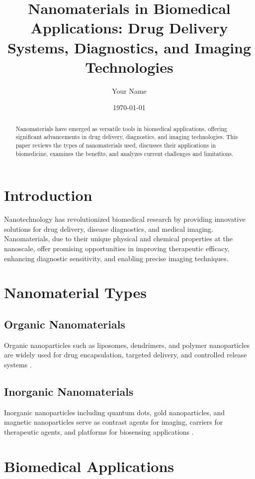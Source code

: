 \documentclass[12pt]{article}
\title{Nanomaterials in Biomedical Applications: Drug Delivery Systems, Diagnostics, and Imaging Technologies}
\author{Your Name}
\date{\today}
\begin{document}
\maketitle

\begin{abstract}
Nanomaterials have emerged as versatile tools in biomedical applications, offering significant advancements in drug delivery, diagnostics, and imaging technologies. This paper reviews the types of nanomaterials used, discusses their applications in biomedicine, examines the benefits, and analyzes current challenges and limitations.
\end{abstract}

\section{Introduction}
Nanotechnology has revolutionized biomedical research by providing innovative solutions for drug delivery, disease diagnostics, and medical imaging. Nanomaterials, due to their unique physical and chemical properties at the nanoscale, offer promising opportunities in improving therapeutic efficacy, enhancing diagnostic sensitivity, and enabling precise imaging techniques.

\section{Nanomaterial Types}
\subsection{Organic Nanomaterials}
Organic nanoparticles such as liposomes, dendrimers, and polymer nanoparticles are widely used for drug encapsulation, targeted delivery, and controlled release systems \citep{sun2014nanotechnology, alexis2008nanomedicine}.

\subsection{Inorganic Nanomaterials}
Inorganic nanoparticles including quantum dots, gold nanoparticles, and magnetic nanoparticles serve as contrast agents for imaging, carriers for therapeutic agents, and platforms for biosensing applications \citep{medintz2008quantum, giljohann2010gold}.

\section{Biomedical Applications}
\end{document}
